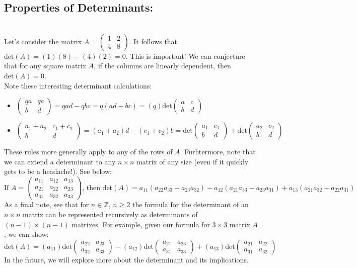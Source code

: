 \documentclass[12pt]{amsart}
\begin{document}
\subsection*{Properties of Determinants:}\hfill\\
Let's consider the matrix $A=\begin{pmatrix}1&2\\4&8\end{pmatrix}$. It follows that $\mathrm{det}(A)=(1)(8)-(4)(2)=0$. This is important! We can conjecture that for any square matrix $A$, if the columns are linearly dependent, then  $\mathrm{det}(A)=0$.\\
Note these interesting determinant calculations:
\begin{itemize}
	\item $\begin{pmatrix}qa&qc\\b&d\end{pmatrix} = qad-qbc = q(ad-bc) = (q)\mathrm{det}\begin{pmatrix}a&c\\b&d\end{pmatrix}$
	\item $\begin{pmatrix}a_1+a_2&c_1+c_2\\b&d\end{pmatrix} = (a_1+a_2)d-(c_1+c_2)b = \mathrm{det}\begin{pmatrix}a_1&c_1\\b&d\end{pmatrix}+\mathrm{det}\begin{pmatrix}a_2&c_2\\b&d\end{pmatrix}$
\end{itemize}
These rules more generally apply to any of the rows of $A$. Furhtermore, note that we can extend a determinant to any $n \times n$ matrix of any size (even if it quickly gets to be a headache!). See below:
\[\text{If } A=\begin{pmatrix}a_{11}&a_{12}&a_{13}\\a_{21}&a_{22}&a_{23}\\a_{31}&a_{32}&a_{33}\end{pmatrix}\text{, then } \mathrm{det}(A)=a_{11}(a_{22}a_{33}-a_{23}a_{32})-a_{12}(a_{21}a_{33}-a_{23}a_{31})+a_{13}(a_{21}a_{32}-a_{22}a_{31})\]
As a final note, see that for $n\in\mathbb{Z}$, $n\geq2$ the formula for the determinant of an $n\times n$ matrix can be represented recursively as determinants of $(n-1)\times (n-1)$ matrixes. For example, given our formula for $3 \times 3$ matrix $A$, we can show:
\[\mathrm{det}(A)=(a_{11})\mathrm{det}\begin{pmatrix}a_{22}&a_{23}\\a_{32}&a_{33}\end{pmatrix}
-(a_{12})\mathrm{det}\begin{pmatrix}a_{21}&a_{23}\\a_{31}&a_{33}\end{pmatrix}
+(a_{13})\mathrm{det}\begin{pmatrix}a_{21}&a_{22}\\a_{31}&a_{32}\end{pmatrix}\]
In the future, we will explore more about the determinant and its implications.
\end{document}
